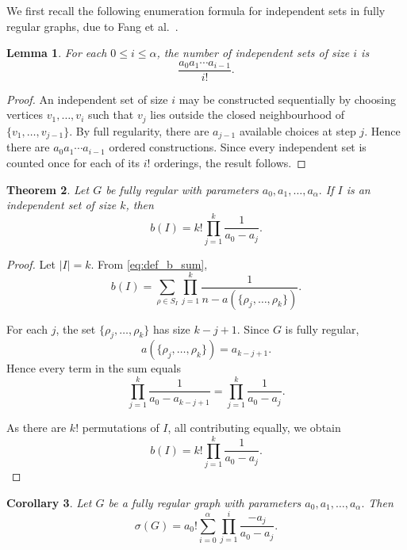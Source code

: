 \documentclass[11pt,a4paper]{article}
\numberwithin{equation}{section}
\theoremstyle{plain}
\newtheorem{theorem}{Theorem}[section]
\newtheorem{lemma}[theorem]{Lemma}
\newtheorem{corollary}[theorem]{Corollary}
\theoremstyle{definition}
\theoremstyle{remark}
\begin{document}
We first recall the following enumeration formula for independent sets in fully regular graphs, due to Fang et al.~\cite{fang2023}.

\begin{lemma}
\label{lem:ind_set_count}
For each \(0\le i\le \alpha\), the number of independent sets of size \(i\) is
\[
\frac{a_0a_1\cdots a_{i-1}}{i!}.
\]
\end{lemma}

\begin{proof}
An independent set of size \(i\) may be constructed sequentially by choosing vertices
\(
v_1,\dots,v_i
\)
such that \(v_j\) lies outside the closed neighbourhood of
\(
\{v_1,\dots,v_{j-1}\}.
\)
By full regularity, there are \(a_{j-1}\) available choices at step \(j\). Hence there are
\(
a_0a_1\cdots a_{i-1}
\)
ordered constructions. Since every independent set is counted once for each of its \(i!\) orderings, the result follows.
\end{proof}

\begin{theorem}
\label{thm:fully_regular_b}
Let \(G\) be fully regular with parameters
\(
a_0,a_1,\dots,a_\alpha.
\)
If \(I\) is an independent set of size \(k\), then
\[
b(I)
=
k!
\prod_{j=1}^{k}
\frac1{a_0-a_j}.
\]
\end{theorem}

\begin{proof}
Let \(|I|=k\). From \eqref{eq:def_b_sum},
\[
b(I)
=
\sum_{\rho\in S_I}
\prod_{j=1}^{k}
\frac1{n-a(\{\rho_j,\dots,\rho_k\})}.
\]

For each \(j\), the set
\(
\{\rho_j,\dots,\rho_k\}
\)
has size \(k-j+1\). Since \(G\) is fully regular,
\[
a(\{\rho_j,\dots,\rho_k\})
=
a_{k-j+1}.
\]
Hence every term in the sum equals
\[
\prod_{j=1}^{k}
\frac1{a_0-a_{k-j+1}}
=
\prod_{j=1}^{k}
\frac1{a_0-a_j}.
\]

As there are \(k!\) permutations of \(I\), all contributing equally, we obtain
\[
b(I)
=
k!
\prod_{j=1}^{k}
\frac1{a_0-a_j}.
\]
\end{proof}

\begin{corollary}
\label{cor:fang_recovery}
Let \(G\) be a fully regular graph with parameters
\(
a_0,a_1,\dots,a_\alpha.
\)
Then
\[
\sigma(G)
=
a_0!
\sum_{i=0}^{\alpha}
\prod_{j=1}^{i}
\frac{-a_j}{a_0-a_j}.
\]
\end{corollary}
\end{document}
